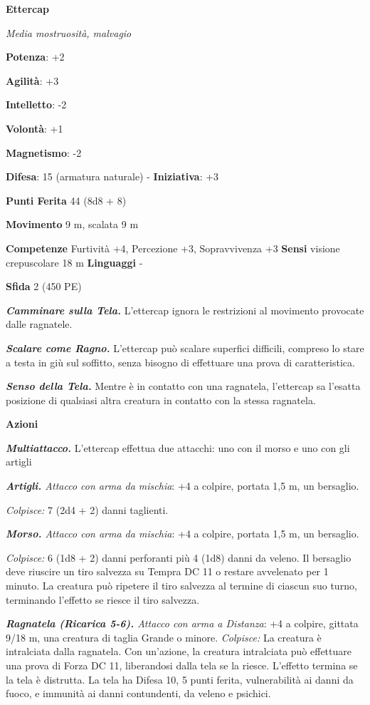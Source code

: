 \begin{multicols}{2}
\textbf{Ettercap}

\emph{Media mostruosità, malvagio}

\textbf{Potenza}: +2

\textbf{Agilità}: +3

\textbf{Intelletto}: -2

\textbf{Volontà}: +1

\textbf{Magnetismo}: -2

\textbf{Difesa}: 15 (armatura naturale) - \textbf{Iniziativa}: +3

\textbf{Punti Ferita} 44 (8d8 + 8)

\textbf{Movimento} 9 m, scalata 9 m

\textbf{Competenze} Furtività +4, Percezione +3, Sopravvivenza +3
\textbf{Sensi} visione crepuscolare 18 m
\textbf{Linguaggi} -

\textbf{Sfida} 2 (450 PE)

\emph{\textbf{Camminare sulla Tela.}} L'ettercap ignora le restrizioni
al movimento provocate dalle ragnatele.

\emph{\textbf{Scalare come Ragno.}} L'ettercap può scalare superfici
difficili, compreso lo stare a testa in giù sul soffitto, senza bisogno
di effettuare una prova di caratteristica.

\emph{\textbf{Senso della Tela.}} Mentre è in contatto con una
ragnatela, l'ettercap sa l'esatta posizione di qualsiasi altra creatura
in contatto con la stessa ragnatela.

\textbf{Azioni}

\emph{\textbf{Multiattacco.}} L'ettercap effettua due attacchi: uno con
il morso e uno con gli artigli

\emph{\textbf{Artigli.} Attacco con arma da mischia}: +4 a colpire,
portata 1,5 m, un bersaglio.

\emph{Colpisce:} 7 (2d4 + 2) danni taglienti.

\emph{\textbf{Morso.} Attacco con arma da mischia}: +4 a colpire,
portata 1,5 m, un bersaglio.

\emph{Colpisce:} 6 (1d8 + 2) danni perforanti più 4 (1d8) danni da
veleno. Il bersaglio deve riuscire un tiro salvezza su Tempra DC
11 o restare avvelenato per 1 minuto. La creatura può ripetere il tiro
salvezza al termine di ciascun suo turno, terminando l'effetto se riesce
il tiro salvezza.

\emph{\textbf{Ragnatela (Ricarica 5-6).} Attacco con arma a Distanza}:
+4 a colpire, gittata 9/18 m, una creatura di taglia Grande o minore.
\emph{Colpisce:} La creatura è intralciata dalla ragnatela. Con
un'azione, la creatura intralciata può effettuare una prova di Forza DC
11, liberandosi dalla tela se la riesce. L'effetto termina se la tela è
distrutta. La tela ha Difesa 10, 5 punti ferita, vulnerabilità ai danni da
fuoco, e immunità ai danni contundenti, da veleno e psichici.


\end{multicols}
